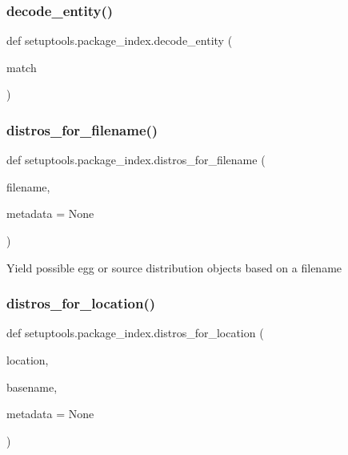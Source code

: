 \subsubsection{\texorpdfstring{decode\+\_\+entity()}{decode\_entity()}}
{\footnotesize\ttfamily def setuptools.\+package\+\_\+index.\+decode\+\_\+entity (\begin{DoxyParamCaption}\item[{}]{match }\end{DoxyParamCaption})}

\mbox{\label{namespacesetuptools_1_1package__index_a2038c36ec69098c4da6c0fce1550f080}} 
\subsubsection{\texorpdfstring{distros\+\_\+for\+\_\+filename()}{distros\_for\_filename()}}
{\footnotesize\ttfamily def setuptools.\+package\+\_\+index.\+distros\+\_\+for\+\_\+filename (\begin{DoxyParamCaption}\item[{}]{filename,  }\item[{}]{metadata = {\ttfamily None} }\end{DoxyParamCaption})}

\begin{DoxyVerb}Yield possible egg or source distribution objects based on a filename\end{DoxyVerb}
 \mbox{\label{namespacesetuptools_1_1package__index_ad1cc6291d57604a866381df28930408a}} 
\subsubsection{\texorpdfstring{distros\+\_\+for\+\_\+location()}{distros\_for\_location()}}
{\footnotesize\ttfamily def setuptools.\+package\+\_\+index.\+distros\+\_\+for\+\_\+location (\begin{DoxyParamCaption}\item[{}]{location,  }\item[{}]{basename,  }\item[{}]{metadata = {\ttfamily None} }\end{DoxyParamCaption})}

